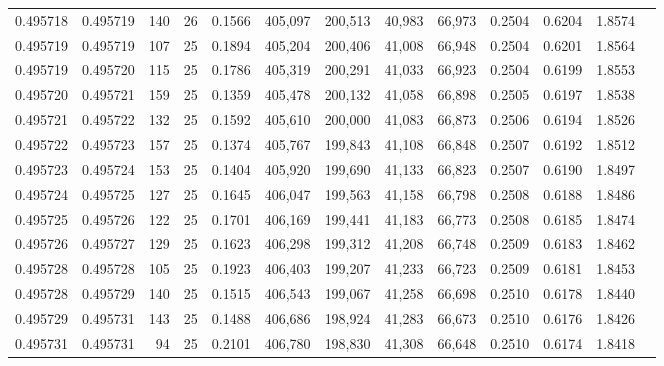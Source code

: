 \begin{tabular}{rrrrrrrrrrrrr}
0.495718 & 0.495719 &   140 &  26 &                                     0.1566 & 405,097 & 200,513 &  40,983 &  66,973 & 0.2504 & 0.6204 & 1.8574 \\
0.495719 & 0.495719 &   107 &  25 &                                     0.1894 & 405,204 & 200,406 &  41,008 &  66,948 & 0.2504 & 0.6201 & 1.8564 \\
0.495719 & 0.495720 &   115 &  25 &                                     0.1786 & 405,319 & 200,291 &  41,033 &  66,923 & 0.2504 & 0.6199 & 1.8553 \\
0.495720 & 0.495721 &   159 &  25 &                                     0.1359 & 405,478 & 200,132 &  41,058 &  66,898 & 0.2505 & 0.6197 & 1.8538 \\
0.495721 & 0.495722 &   132 &  25 &                                     0.1592 & 405,610 & 200,000 &  41,083 &  66,873 & 0.2506 & 0.6194 & 1.8526 \\
0.495722 & 0.495723 &   157 &  25 &                                     0.1374 & 405,767 & 199,843 &  41,108 &  66,848 & 0.2507 & 0.6192 & 1.8512 \\
0.495723 & 0.495724 &   153 &  25 &                                     0.1404 & 405,920 & 199,690 &  41,133 &  66,823 & 0.2507 & 0.6190 & 1.8497 \\
0.495724 & 0.495725 &   127 &  25 &                                     0.1645 & 406,047 & 199,563 &  41,158 &  66,798 & 0.2508 & 0.6188 & 1.8486 \\
0.495725 & 0.495726 &   122 &  25 &                                     0.1701 & 406,169 & 199,441 &  41,183 &  66,773 & 0.2508 & 0.6185 & 1.8474 \\
0.495726 & 0.495727 &   129 &  25 &                                     0.1623 & 406,298 & 199,312 &  41,208 &  66,748 & 0.2509 & 0.6183 & 1.8462 \\
0.495728 & 0.495728 &   105 &  25 &                                     0.1923 & 406,403 & 199,207 &  41,233 &  66,723 & 0.2509 & 0.6181 & 1.8453 \\
0.495728 & 0.495729 &   140 &  25 &                                     0.1515 & 406,543 & 199,067 &  41,258 &  66,698 & 0.2510 & 0.6178 & 1.8440 \\
0.495729 & 0.495731 &   143 &  25 &                                     0.1488 & 406,686 & 198,924 &  41,283 &  66,673 & 0.2510 & 0.6176 & 1.8426 \\
0.495731 & 0.495731 &    94 &  25 &                                     0.2101 & 406,780 & 198,830 &  41,308 &  66,648 & 0.2510 & 0.6174 & 1.8418 \\

\end{tabular}
